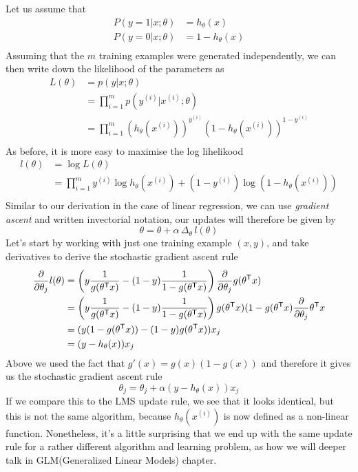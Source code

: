 Let us assume that 
\begin{align*}
    P(y = 1 | x; \theta) & = h_{\theta}(x) \\
    P(y = 0 | x; \theta) & = 1 - h_{\theta}(x) \\
\end{align*}
Assuming that the $m$ training examples were generated independently, we can then write down the 
likelihood of the parameters as
\begin{align*}
    L(\theta) & = p(y | x; \theta) \\
              & = \prod _{i = 1}^m p(y^{(i)} | x^{(i)}; \theta) \\
              & = \prod _{i = 1}^m (h_{\theta}(x^{(i)}))^{y^{(i)}} (1 - h_{\theta}(x^{(i)}))^{1 - y^{(i)}} \\
\end{align*}
As before, it is more easy to maximise the log lihelikood 
\begin{align*}
    l(\theta) & = \log L(\theta) \\
              & = \prod _{i=1}^m y^{(i)} \log h_{\theta}(x^{(i)}) + (1 - y^{(i)}) \log (1 - h_{\theta}(x^{(i)})) \\
\end{align*}
Similar to our derivation in the case of linear regression, we can use \emph{gradient ascent} and 
written invectorial notation, our updates will therefore be given by
\[ \theta = \theta + \alpha \, \Delta _{\theta} \, l(\theta) \]
Let’s start by working with just one training example $(x, y)$, and take derivatives to derive
the stochastic gradient ascent rule
\begin{align*}
    \frac{\partial}{\partial \theta_j} l(\theta) & = \left(y \frac{1}{g(\theta ^ \mathsf{T} x)} - 
                                        (1 - y) \frac{1}{1 - g(\theta ^ \mathsf{T} x)}\right) 
                                        \frac{\partial}{\partial \theta_j} g(\theta ^ \mathsf{T} x) \\
                                    & = \left(y \frac{1}{g(\theta ^ \mathsf{T} x)} - 
                                        (1 - y) \frac{1}{1 - g(\theta ^ \mathsf{T} x)}\right)
                                        g(\theta ^ \mathsf{T} x)(1 - g(\theta ^ \mathsf{T} x)
                                        \frac{\partial}{\partial \theta_j} \theta ^ \mathsf{T} x \\
                                    & = (y (1 - g(\theta ^ \mathsf{T} x)) - (1-y) g(\theta ^ \mathsf{T} x)) x_j \\
                                                 & = (y - h_{\theta}(x))x_j \\
\end{align*}
Above we used the fact that $g'(x) = g(x)(1-g(x))$ and therefore it gives us the stochastic gradient ascent rule
\[ \theta_j = \theta_j + \alpha (y - h_{\theta}(x))x_j \]
If we compare this to the LMS update rule, we see that it looks identical, but this is not 
the same algorithm, because $h_{\theta}(x^{(i)})$ is now defined as a non-linear function.\newline
Nonetheless, it’s a little surprising that we end up with the same update rule for a rather different algorithm
and learning problem, as how we will deeper talk in GLM(Generalized Linear Models) chapter.

